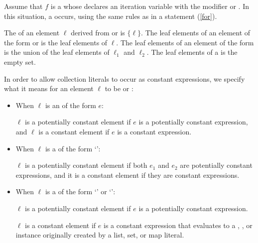 \documentclass[makeidx]{article}
\begin{document}
{\LMHash{}%
Assume that $f$ is a  whose 
declares an iteration variable
with the modifier \CONST{} or \LATE{}.
In this situation, a  occurs,
using the same rules as in a \FOR{} statement
(\ref{for}).


\LMHash{}%
The  of an element $\ell$ derived from
 or 
is $\{\ell\}$.
The leaf elements of an element of the form
 or
is the leaf elements of $\ell$.
The leaf elements of an element of the form
is the union of the leaf elements of $\ell_1$ and $\ell_2$.
The leaf elements of a  is the empty set.


\LMHash{}%
In order to allow collection literals to occur as constant expressions,
we specify what it means for an element $\ell$
to be
or
:

\begin{itemize}
\item
  When $\ell$ is an  of the form $e$:

  $\ell$ is a potentially constant element
  if $e$ is a potentially constant expression,
  and $\ell$ is a constant element
  if $e$ is a constant expression.
\item
  When $\ell$ is a 
  of the form `':

  $\ell$ is a potentially constant element
  if both $e_1$ and $e_2$ are potentially constant expressions,
  and it is a constant element if they are constant expressions.
\item
  When $\ell$ is a 
  of the form `' or `':

  $\ell$ is a potentially constant element
  if $e$ is a potentially constant expression.

  $\ell$ is a constant element
  if $e$ is a constant expression that evaluates
  to a , , or  instance
  originally created by a list, set, or map literal.


\end{itemize}}
\end{document}
